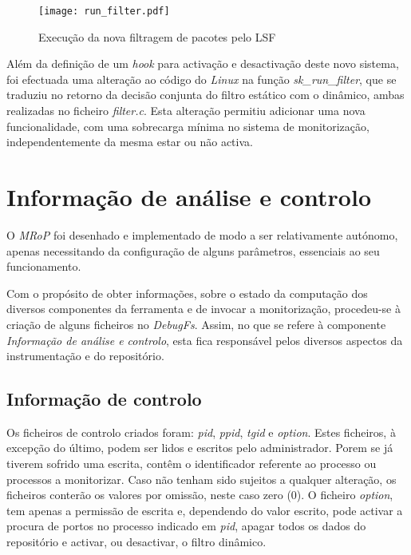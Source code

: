 \begin{figure}[!ht]
\centering
\texttt{[image: run\_filter.pdf]}
\caption{Execução da nova filtragem de pacotes pelo LSF}
\label{fig:run_filter}
\end{figure}

Além da definição de um \textit{hook} para activação e desactivação deste novo sistema, foi efectuada uma alteração ao código do \textit{Linux} na função \textit{sk\_run\_filter}, que se traduziu no retorno da decisão conjunta do filtro estático com o dinâmico, ambas realizadas no ficheiro \textit{filter.c}.
Esta alteração permitiu adicionar uma nova funcionalidade, com uma sobrecarga mínima no sistema de monitorização, independentemente da mesma estar ou não activa.

\section{Informação de análise e controlo}

O \textit{MRoP} foi desenhado e implementado de modo a ser relativamente autónomo, apenas necessitando da configuração de alguns parâmetros, essenciais ao seu funcionamento.

Com o propósito de obter informações, sobre o estado da computação dos diversos componentes da ferramenta e de invocar a monitorização, procedeu-se à criação de alguns ficheiros no \textit{DebugFs}.
Assim, no que se refere à componente \textit{Informação de análise e controlo}, esta fica responsável pelos diversos aspectos da instrumentação e do repositório.

\subsection{Informação de controlo}

Os ficheiros de controlo criados foram: \textit{pid}, \textit{ppid}, \textit{tgid} e \textit{option}.
Estes ficheiros, à excepção do último, podem ser lidos e escritos pelo administrador.
Porem se já tiverem sofrido uma escrita, contêm o identificador referente ao processo ou processos a monitorizar.
Caso não tenham sido sujeitos a qualquer alteração, os ficheiros conterão os valores por omissão, neste caso zero (0).
O ficheiro \textit{option}, tem apenas a permissão de escrita e, dependendo do valor escrito, pode activar a procura de portos no processo indicado em \textit{pid}, apagar todos os dados do repositório e activar, ou desactivar, o filtro dinâmico.


